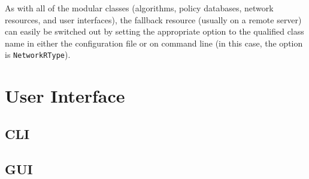As with all of the modular classes (algorithms, policy databases, network resources, and user interfaces), the fallback resource (usually on a remote server) can easily be switched out by setting the appropriate  option to the qualified class name in either the configuration file or on command line (in this case, the option is \texttt{NetworkRType}).

\section{User Interface} %


\subsection{CLI}%




\subsection{GUI}%

